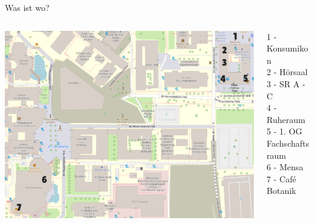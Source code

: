 \documentclass[t,aspectratio=1610, 12pt]{beamer} %
\begin{document}
\begin{frame}{Was ist wo?}
	\begin{columns}[c]
		\begin{column}{.9\textwidth}
			\centering\includegraphics[width=0.7\linewidth]{Karte_NeuenheimerFeld}
		\end{column}
		\begin{column}{.3\textwidth}
			1 - Konsumikon \\
			2 - Hörsaal \\
			3 - SR A - C \\
			4 - Ruheraum \\
			5 - 1. OG Fachschaftsraum \\
			6 - Mensa \\
			7 - Café Botanik \\
		\end{column}
	\end{columns}
\end{frame}
\end{document}
